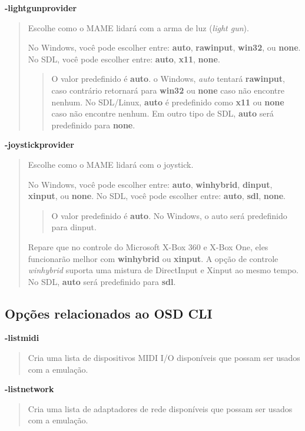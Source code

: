 \documentclass[letterpaper,10pt,brazil]{sphinxmanual}
\begin{document}
\label{commandline/commandline-all:mame-commandline-lightgunprovider}
\textbf{-lightgunprovider}
\begin{quote}

Escolhe como o MAME lidará com a arma de luz (\emph{light gun}).

No Windows, você pode escolher entre: \textbf{auto}, \textbf{rawinput},
\textbf{win32}, ou \textbf{none}.
No SDL, você pode escolher entre: \textbf{auto}, \textbf{x11}, \textbf{none}.
\begin{quote}

O valor predefinido é \textbf{auto}.
o Windows, \emph{auto} tentará \textbf{rawinput}, caso contrário retornará
para \textbf{win32} ou \textbf{none} caso não encontre nenhum.
No SDL/Linux, \textbf{auto} é predefinido como \textbf{x11} ou \textbf{none}
caso não encontre nenhum.
Em outro tipo de SDL, \textbf{auto} será predefinido para \textbf{none}.
\end{quote}
\end{quote}
\label{commandline/commandline-all:mame-commandline-joystickprovider}
\textbf{-joystickprovider}
\begin{quote}

Escolhe como o MAME lidará com o joystick.

No Windows, você pode escolher entre: \textbf{auto}, \textbf{winhybrid},
\textbf{dinput}, \textbf{xinput}, ou \textbf{none}.
No SDL, você pode escolher entre: \textbf{auto}, \textbf{sdl}, \textbf{none}.
\begin{quote}

O valor predefinido é \textbf{auto}.
No Windows, o auto será predefinido para dinput.
\end{quote}

Repare que no controle do Microsoft X-Box 360 e X-Box One, eles
funcionarão melhor com \textbf{winhybrid} ou \textbf{xinput}. A opção de
controle \emph{winhybrid} suporta uma mistura de DirectInput e Xinput ao
mesmo tempo.
No SDL, \textbf{auto} será predefinido para \textbf{sdl}.
\end{quote}


\subsection{Opções relacionados ao OSD CLI}
\label{commandline/commandline-all:opcoes-relacionados-ao-osd-cli}\label{commandline/commandline-all:mame-commandline-listmidi}
\textbf{-listmidi}
\begin{quote}

Cria uma lista de dispositivos MIDI I/O disponíveis que possam ser
usados com a emulação.
\end{quote}
\label{commandline/commandline-all:mame-commandline-listnetwork}
\textbf{-listnetwork}
\begin{quote}

Cria uma lista de adaptadores de rede disponíveis que possam ser
usados com a emulação.
\end{quote}
\end{document}
